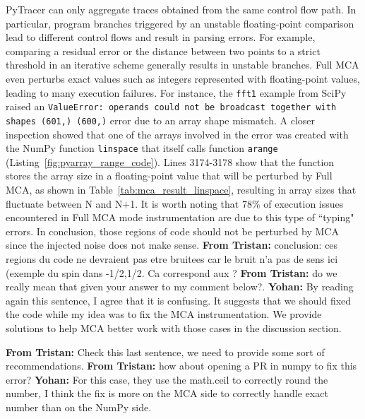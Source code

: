 \documentclass[11pt]{article}
\newcommand{\tristan}[1]{\color{orange}\textbf{From Tristan:} #1\color{black}\xspace}
\newcommand{\Yohan}[1]{\color{green!75!black}\textbf{Yohan:} #1\color{black}\xspace}
\newcommand{\pytracer}[0]{PyTracer\xspace}
\begin{document}
\pytracer can only aggregate traces obtained from the same control flow path. In particular, program branches triggered by an unstable floating-point comparison lead to different control flows and result in parsing errors. 
For example, comparing a residual error or the distance between two points to a strict threshold in an iterative scheme generally results in unstable branches. 
Full MCA even perturbs exact values such as integers represented with floating-point values, leading to many execution failures. For instance, the \texttt{fft1} example from SciPy raised an \texttt{ValueError: operands could not be broadcast together with shapes (601,) (600,)} error due to an array shape mismatch. A closer inspection showed that one of the arrays involved in the error was created with the NumPy function \texttt{linspace} that itself calls function \texttt{arange} (Listing~\ref{fig:pyarray_range_code}). 
Lines 3174-3178 show that the function stores the array size in a floating-point value that will be perturbed by Full MCA, as shown in Table~\ref{tab:mca_result_linspace}, resulting in array sizes that fluctuate between N and N+1.
It is worth noting that 78\% of execution issues encountered in Full MCA mode instrumentation
are due to this type of ``typing" errors.  
In conclusion, those regions of code should not be perturbed by MCA since the injected noise does not make sense.
\tristan{conclusion: ces regions du code ne devraient pas etre bruitees car le bruit n'a pas de sens ici (exemple du spin dans -1/2,1/2. Ca correspond aux ?}
\tristan{do we really mean that given your answer to my comment below?}. 
\Yohan{By reading again this sentence, I agree that it is confusing. 
It suggests that we should fixed the code while my idea was to fix the MCA instrumentation.}
We provide solutions to help MCA better work with those cases in the discussion section.

\tristan{Check this last sentence, we need to provide some sort of recommendations}. \tristan{how about opening a PR in numpy to fix this error?}
\Yohan{For this case, they use the math.ceil to correctly round the number, I think the fix is more on the MCA side to
correctly handle exact number than on the NumPy side.}
\end{document}
